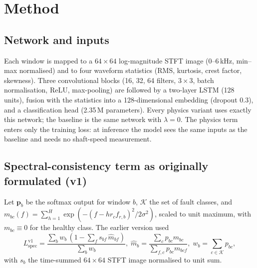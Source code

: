 \documentclass[conference]{IEEEtran}
\newcommand{\Lspec}{L_{\mathrm{spec}}}
\begin{document}
\section{Method}
\label{sec:method}
\subsection{Network and inputs}
Each window is mapped to a $64\times64$ log-magnitude STFT image (0--6\,kHz,
min--max normalised) and to four waveform statistics (RMS, kurtosis, crest
factor, skewness). Three convolutional blocks (16, 32, 64 filters, $3\times3$,
batch normalisation, ReLU, max-pooling) are followed by a two-layer LSTM (128
units), fusion with the statistics into a 128-dimensional embedding (dropout
0.3), and a classification head (2.35\,M parameters). Every physics variant
uses exactly this network; the baseline is the same network with $\lambda=0$.
The physics term enters only the training loss: at inference the model sees
the same inputs as the baseline and needs no shaft-speed measurement.

\subsection{Spectral-consistency term as originally formulated (v1)}
Let $\mathbf{p}_b$ be the softmax output for window $b$, $\mathcal{K}$ the
set of fault classes, and $m_{bc}(f)=\sum_{h=1}^{H}\exp(-(f-h r_c f_{r,b})^2/2\sigma^2)$,
scaled to unit maximum, with $m_{bc}\equiv0$ for the healthy class. The earlier
version used
\begin{equation}
\Lspec^{\mathrm{v1}} = \frac{\sum_b w_b\,(1-\sum_f s_{bf}\,\hat m_{bf})}{\sum_b w_b},\;
\hat m_b = \frac{\sum_c p_{bc} m_{bc}}{\sum_{f,c} p_{bc} m_{bcf}},\;
w_b=\sum_{c\in\mathcal K}p_{bc},
\label{eq:v1}
\end{equation}
with $s_b$ the time-summed $64\times64$ STFT image normalised to unit sum.
\end{document}
